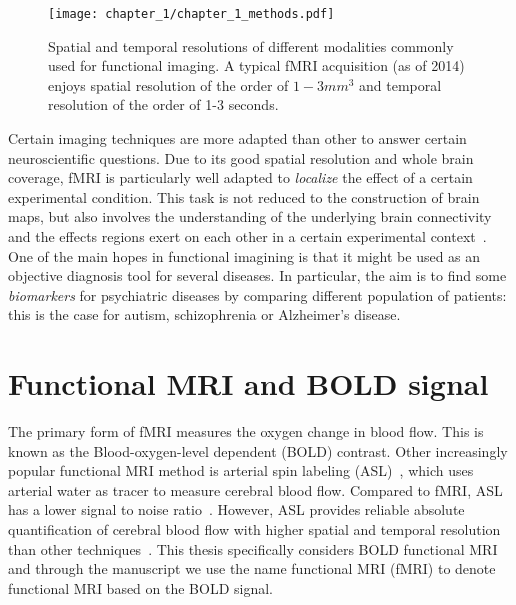 \begin{figure}[h!tb]
\center \texttt{[image: chapter\_1/chapter\_1\_methods.pdf]}
\caption[Spatial and temporal resolutions of the different modalities commonly
used for functional imaging]{Spatial and temporal resolutions of different
modalities commonly
used for functional imaging. A typical fMRI acquisition (as of 2014) enjoys spatial resolution of the order of {$1-3mm^3$} and temporal resolution of the order of 1-3 seconds.}\label{fig:chapter1_methods}
\end{figure}

Certain imaging techniques are more adapted than other to answer certain neuroscientific questions. Due to its good spatial resolution and whole brain coverage, fMRI is particularly well adapted to \emph{localize} the effect of a certain experimental condition. This task is not reduced to the construction of brain maps, but also involves the understanding of the underlying brain connectivity~\citep{johansen2005functional,behrens2006consistent} and the effects regions exert on each other in a certain experimental context~\citep{pessiglione2007brain, behrens2007learning}. One of the main hopes in functional imagining is that it might be used as an objective diagnosis tool for several diseases. In particular, the aim is to find some \emph{biomarkers} for psychiatric diseases by comparing different population of patients: this is the case for autism, schizophrenia or Alzheimer's disease. 


\section{Functional MRI and BOLD signal}





The primary form of fMRI measures the oxygen change in blood flow. This is known as the Blood-oxygen-level dependent (BOLD) contrast. Other increasingly popular functional MRI method is arterial spin labeling (ASL)~\citep{detre1994tissue, alsop1998multisection, williams1992magnetic}, which uses arterial water as tracer to measure cerebral blood flow. Compared to fMRI, ASL has a lower signal to noise ratio~\citep{detre2002technical}. However, ASL provides reliable absolute quantification of cerebral blood flow with higher spatial and temporal resolution than other techniques~\citep{borogovac2012arterial}. This thesis specifically considers BOLD functional MRI and through the manuscript we use the name functional MRI (fMRI) to denote functional MRI based on the BOLD signal.

